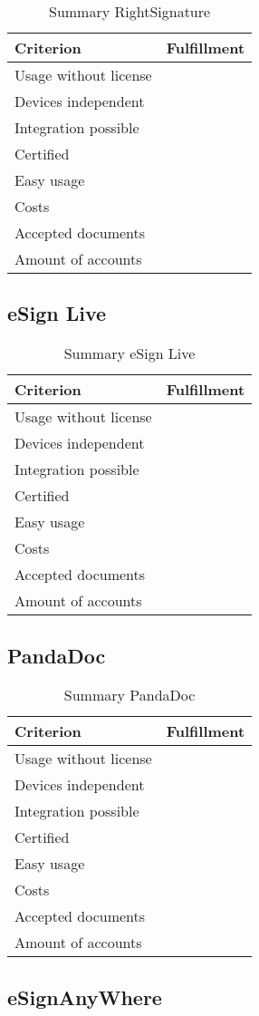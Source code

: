 \begin{table}[h]
	\begin{tabular}{|p{4cm}|p{10cm}|} \hline
		Criterion & Fulfillment \\ \hline
		Usage without license & \\ \hline
		Devices independent & \\ \hline
		Integration possible & \\ \hline
		Certified & \\ \hline
		Easy usage & \\ \hline
		Costs & \\ \hline
		Accepted documents & \\ \hline
		Amount of accounts & \\ \hline
	\end{tabular}
	\caption{Summary RightSignature}
	\label{tab:rightsignature}
\end{table}

\subsection{eSign Live}

\begin{table}[h]
	\begin{tabular}{|p{4cm}|p{10cm}|} \hline
		Criterion & Fulfillment \\ \hline
		Usage without license & \\ \hline
		Devices independent & \\ \hline
		Integration possible & \\ \hline
		Certified & \\ \hline
		Easy usage & \\ \hline
		Costs & \\ \hline
		Accepted documents & \\ \hline
		Amount of accounts & \\ \hline
	\end{tabular}
	\caption{Summary eSign Live}
	\label{tab:esign}
\end{table}

\subsection{PandaDoc}

\begin{table}[h]
	\begin{tabular}{|p{4cm}|p{10cm}|} \hline
		Criterion & Fulfillment \\ \hline
		Usage without license & \\ \hline
		Devices independent & \\ \hline
		Integration possible & \\ \hline
		Certified & \\ \hline
		Easy usage & \\ \hline
		Costs & \\ \hline
		Accepted documents & \\ \hline
		Amount of accounts & \\ \hline
	\end{tabular}
	\caption{Summary PandaDoc}
	\label{tab:pandadoc}
\end{table}

\subsection{eSignAnyWhere}
